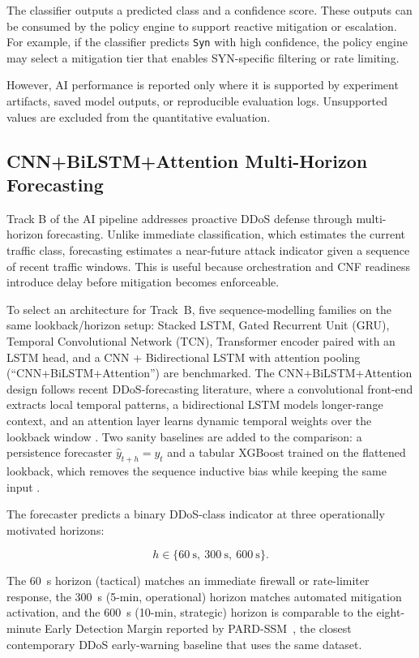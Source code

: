 \documentclass[12pt, a4paper, reqno, oneside]{book}
\begin{document}
The classifier outputs a predicted class and a confidence score. These outputs
can be consumed by the policy engine to support reactive mitigation or
escalation. For example, if the classifier predicts \texttt{Syn} with
high confidence, the policy engine may select a mitigation tier that enables
SYN-specific filtering or rate limiting.

However, AI performance is reported only where it is supported by experiment
artifacts, saved model outputs, or reproducible evaluation logs.
Unsupported values are excluded from the quantitative evaluation.

\subsection{CNN+BiLSTM+Attention Multi-Horizon Forecasting}
\label{sec:forecast-bg}

Track B of the AI pipeline addresses proactive DDoS defense through
multi-horizon forecasting. Unlike immediate classification, which estimates the
current traffic class, forecasting estimates a near-future attack indicator
given a sequence of recent traffic windows. This is useful because
orchestration and CNF readiness introduce delay before mitigation becomes
enforceable.

To select an architecture for Track~B, five sequence-modelling
families on the same lookback/horizon setup: Stacked LSTM, Gated Recurrent
Unit (GRU), Temporal Convolutional Network (TCN), Transformer encoder paired
with an LSTM head, and a CNN + Bidirectional LSTM with attention pooling
(``CNN+BiLSTM+Attention'') are benchmarked. The CNN+BiLSTM+Attention design follows recent
DDoS-forecasting literature, where a convolutional front-end extracts local
temporal patterns, a bidirectional LSTM models longer-range context, and an
attention layer learns dynamic temporal weights over the lookback window
\cite{alghazzawi2021cnnbilstm, alanazi2022ensembleddos, hamcid2025nature,
cnnbilstmattn2025}. Two sanity baselines are added to the comparison: a
persistence forecaster $\hat{y}_{t+h} = y_t$ \cite{hyndman2018forecasting} and
a tabular XGBoost trained on the flattened lookback, which removes the
sequence inductive bias while keeping the same input
\cite{zerveas2021tstransformer}.

The forecaster predicts a binary DDoS-class indicator at three operationally
motivated horizons:

\[
h \in \{60~\text{s},\ 300~\text{s},\ 600~\text{s}\}.
\]

The 60~s horizon (tactical) matches an immediate firewall or
rate-limiter response, the 300~s (5-min, operational) horizon matches
automated mitigation activation, and the 600~s (10-min, strategic)
horizon is comparable to the eight-minute Early Detection Margin reported by
PARD-SSM~\cite{hiremath2026pardssm}, the closest contemporary DDoS
early-warning baseline that uses the same dataset.
\end{document}
